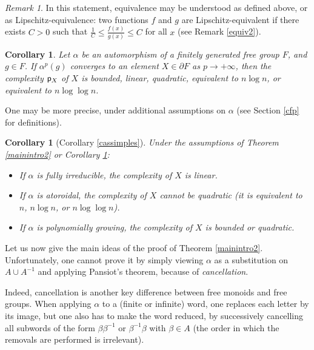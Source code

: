 \documentclass[11pt]{amsart}
\newtheorem{cor}[thm]{Corollary}
\theoremstyle{remark}
\newtheorem{rem}[thm]{Remark}
\newcommand{\m} {^{-1}}
\newcommand{\cp}{{\sf  p}}
\newcommand{\bo}{\partial}
\begin{document}
\begin{rem}
  In this statement, equivalence may be understood as defined above, or as Lipschitz-equivalence: two functions $f$ and $g$ are Lipschitz-equivalent if there exists $C>0$ such that $\frac 1 C\le \frac{f(x)}{g(x)}\le C$ for all $x$ (see Remark \ref{equiv2}).
\end{rem}

\begin{cor}\label{mainintro}
 Let $\alpha$ be an automorphism of a finitely generated free group $F$, and $g\in F$.    If  $\alpha^p(g)$ converges to an element $X\in \bo F$ as $p\to+\infty$, then the  complexity $\cp_X$ of $X$ is bounded, linear, quadratic, equivalent to $n\log n$, or equivalent to $n\log \log n$.
\end{cor}


One may be more precise, under additional assumptions on $\alpha$ (see Section \ref{cfp} for definitions).
 
\begin{cor}[Corollary \ref {cassimples}] \label{cassimplesintro}  Under the assumptions of   Theorem \ref{mainintro2} or Corollary \ref{mainintro}:


\begin{itemize}
 
\item
If $\alpha$ is fully irreducible, the complexity of $X$  is linear.
\item
If $\alpha$ is atoroidal, the complexity of $X$ cannot be quadratic (it is equivalent  to $n$, $n\log n$, or   $n\log \log n$).

\item
 If $\alpha$ is polynomially growing, the complexity of $X$ is  bounded or quadratic.  
 \end{itemize}
\end{cor}

 
Let us now give the main ideas of the proof of   Theorem   
\ref{mainintro2}.
 Unfortunately,
 one cannot prove  it  by simply viewing $\alpha$ as a substitution on $A\cup A\m$ and applying Pansiot's theorem, because of \emph{cancellation}. 
 
Indeed, cancellation is another key difference between free monoids and free groups. When applying $\alpha$ to a (finite or infinite) word, one replaces each letter by its image, but one also has to make the word reduced, by successively cancelling all subwords of the form $\beta\beta\m$ or $\beta\m\beta$ with $\beta\in A$ (the order in which the removals are performed is irrelevant). 
\end{document}
